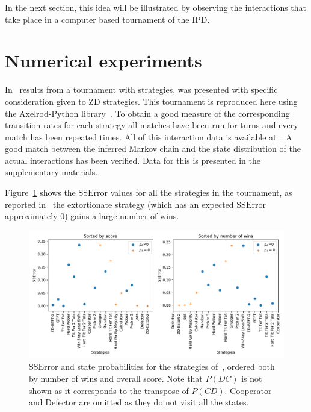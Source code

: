 \documentclass[a4paper]{article}
\begin{document}
In the next section, this idea will be illustrated by observing the interactions
that take place in a computer based tournament of the IPD\@.

\section{Numerical experiments}\label{sec:numerical-experiments}

In~\cite{Stewart2012} results from a tournament with
 strategies,
was presented with specific consideration given to ZD strategies. This
tournament is reproduced here using the Axelrod-Python
library~\cite{Knight2016}. To obtain a good measure of the corresponding
transition rates for each strategy all matches have been run for
 turns and every match has been
repeated  times. All of this
interaction data is available at~\cite{vincent_knight_2018_1297075}. A good
match between the inferred Markov chain and the state distribution of the actual
interactions has been verified. Data for this is presented in the supplementary
materials.

Figure~\ref{fig:SSError_overall_in_stewart_plotkin} shows the \(\text{SSError}\)
values for all the strategies in the tournament, as reported
in~\cite{Stewart2012} the extortionate strategy (which has an expected
\(\text{SSError}\) approximately 0) gains a large number of wins.

\begin{figure}[!htbp]
    \centering
    \includegraphics[width=.8\textwidth]{./assets/img/SSError_overall_in_stewart_plotkin/main.pdf}
    \caption{\(\text{SSError}\) and state probabilities for the strategies
        of~\cite{Stewart2012}, ordered both by number of wins and overall score.
        Note that \(P(DC)\) is not shown as it corresponds to the transpose of
        \(P(CD)\). Cooperator and Defector are omitted as they do not visit all
        the states.}
    \label{fig:SSError_overall_in_stewart_plotkin}
\end{figure}
\end{document}
